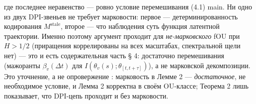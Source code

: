 \documentclass[12pt]{iopart}
\begin{document}
где последнее неравенство --- ровно условие перемешивания (4.1) main. Ни одно из двух DPI-звеньев не требует марковости: первое --- детерминированность кодирования \(M^{\text{stale}}\), второе --- что наблюдения суть функция латентной траектории. Именно поэтому аргумент проходит для \emph{не-марковского} fOU при \(H > 1/2\) (приращения коррелированы на всех масштабах, спектральной щели нет) --- это и есть содержательная часть § 4: достаточно перемешивания (мажоранты \(\beta_v(\Delta t)\) для \(I(\theta_v(s);\theta_{[t,t+\tau]})\)), а не марковской декомпозиции. Это уточнение, а не опровержение \cite{Andriishin2026b}: марковость в Лемме 2 --- \emph{достаточное}, не необходимое условие, и Лемма 2 корректна в своём OU-классе; Теорема 2 лишь показывает, что DPI-цепь проходит и без марковости.
\end{document}
